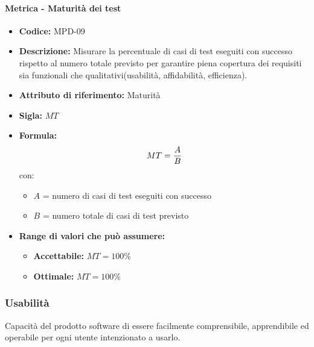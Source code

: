     \paragraph{Metrica - Maturità dei test} 
        \begin{itemize}
        \item   \textbf{Codice:} MPD-09
        \item  \textbf{Descrizione:} Misurare la percentuale di casi di test eseguiti con successo rispetto al numero totale previsto per garantire piena copertura dei requisiti sia funzionali che qualitativi(usabilità, affidabilità, efficienza).
        \item   \textbf{Attributo di riferimento:} Maturità
        \item    \textbf{Sigla:} $MT$
        \item   \textbf{Formula:} $$MT = {A \over B}$$
        con:
        \begin{itemize}
            \item $A$ = numero di casi di test eseguiti con successo
            \item $B$ = numero totale di casi di test previsto
        \end{itemize}
        
        \item \textbf{Range di valori che può assumere:}
        \begin{itemize}
            \item \textbf{Accettabile:} $MT = 100\% $
            \item \textbf{Ottimale:} $MT = 100\% $
        \end{itemize}
    \end{itemize}
       
\subsubsection{Usabilità}
   Capacità del prodotto software di essere facilmente comprensibile, apprendibile ed operabile per ogni utente intenzionato a usarlo.
   
